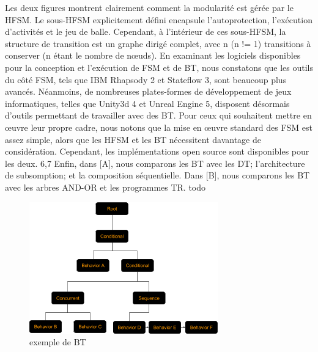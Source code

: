 \documentclass[titlepage]{article}
\begin{document}
			Les deux figures montrent clairement comment la modularité est gérée par le HFSM. Le sous-HFSM explicitement défini encapsule l'autoprotection, l'exécution d'activités et le jeu de balle. Cependant, à l'intérieur de ces sous-HFSM, la structure de transition est un graphe dirigé complet, avec n (n != 1) transitions à conserver (n étant le nombre de nœuds).
			En examinant les logiciels disponibles pour la conception et l'exécution de FSM et de BT, nous constatons que les outils du côté FSM, tels que IBM Rhapsody 2 et Stateflow 3, sont beaucoup plus avancés. Néanmoins, de nombreuses plates-formes de développement de jeux informatiques, telles que Unity3d 4 et Unreal Engine 5, disposent désormais d'outils permettant de travailler avec des BT. Pour ceux qui souhaitent mettre en œuvre leur propre cadre, nous notons que la mise en œuvre standard des FSM est assez simple, alors que les HFSM et les BT nécessitent davantage de considération. Cependant, les implémentations open source sont disponibles pour les deux. 6,7 Enfin, dans [A], nous comparons les BT avec les DT; l'architecture de subsomption; et la composition séquentielle. Dans [B], nous comparons les BT avec les arbres AND-OR et les programmes TR.
	todo
	\\
	\begin{figure}[h!]
		\includegraphics[width=\linewidth]{img/behavior_trees_example.png}
		\caption{exemple de BT \cite{rasmussen}}
		\label{fig:BT1}
	\end{figure}
	\\
\end{document}
